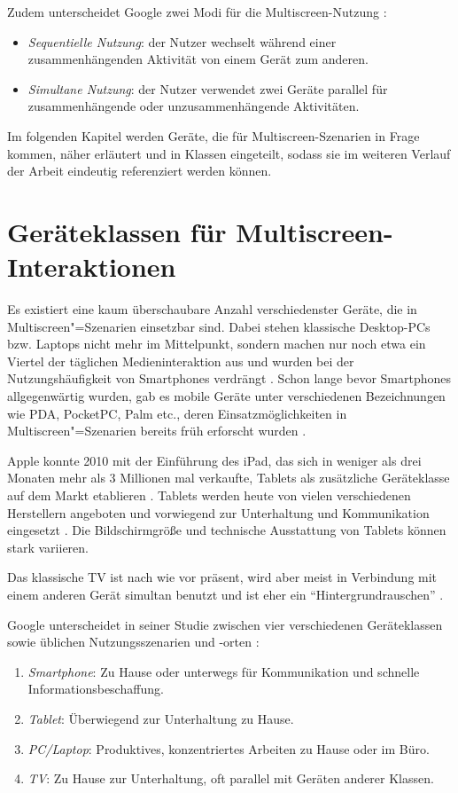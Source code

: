 Zudem unterscheidet Google zwei Modi für die Multiscreen-Nutzung \citep{Google2012}:
\begin{itemize}
\item \textit{Sequentielle Nutzung}: der Nutzer wechselt während einer zusammenhängenden Aktivität von einem Gerät zum anderen.
\item \textit{Simultane Nutzung}: der Nutzer verwendet zwei Geräte parallel für zusammenhängende oder unzusammenhängende Aktivitäten.
\end{itemize}

Im folgenden Kapitel werden Geräte, die für Multiscreen-Szenarien in Frage kommen, näher erläutert und in Klassen eingeteilt, sodass sie im weiteren Verlauf der Arbeit eindeutig referenziert werden können. 

\section{Geräteklassen für Multiscreen-Interaktionen}
\label{sec:geräteklassen}
Es existiert eine kaum überschaubare Anzahl verschiedenster Geräte, die in Multiscreen"=Szenarien einsetzbar sind. Dabei stehen klassische Desktop-PCs bzw. Laptops nicht mehr im Mittelpunkt, sondern machen nur noch etwa ein Viertel der täglichen Medieninteraktion aus und wurden bei der Nutzungshäufigkeit von Smartphones verdrängt \citep{Google2012}. Schon lange bevor Smartphones allgegenwärtig wurden, gab es mobile Geräte unter verschiedenen Bezeichnungen wie \ac{PDA}, PocketPC, Palm etc., deren Einsatzmöglichkeiten in Multiscreen"=Szenarien bereits früh erforscht wurden \citep{Hinckley2004}. 

Apple konnte 2010 mit der Einführung des iPad, das sich in weniger als drei Monaten mehr als 3 Millionen mal verkaufte, Tablets als zusätzliche Geräteklasse auf dem Markt etablieren \citep{Apple2010}. Tablets werden heute von vielen verschiedenen Herstellern angeboten und vorwiegend zur Unterhaltung und Kommunikation eingesetzt \citep{Google2012}. Die Bildschirmgröße und technische Ausstattung von Tablets können stark variieren.

Das klassische TV ist nach wie vor präsent, wird aber meist in Verbindung mit einem anderen Gerät simultan benutzt \citep{Google2012} und ist eher ein "`Hintergrundrauschen"' \citep{Microsoft2013}.

Google unterscheidet in seiner Studie zwischen vier verschiedenen Geräteklassen sowie üblichen Nutzungsszenarien und -orten \citep{Google2012}:
\begin{enumerate}
\item \textit{Smartphone}: Zu Hause oder unterwegs für Kommunikation und schnelle Informationsbeschaffung.
\item \textit{Tablet}: Überwiegend zur Unterhaltung zu Hause.
\item \textit{PC/Laptop}: Produktives, konzentriertes Arbeiten zu Hause oder im Büro.
\item \textit{TV}: Zu Hause zur Unterhaltung, oft parallel mit Geräten anderer Klassen.
\end{enumerate}


